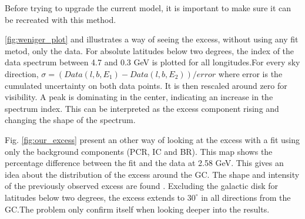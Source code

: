 Before trying to upgrade the current model, it is important to make sure it can be recreated with this method. 

\ref{fig:weniger_plot} and  illustrates a way of seeing the excess, without using any fit metod, only the data. For absolute latitudes below two degrees, the index of the data spectrum between 4.7 and 0.3 GeV is plotted for all longitudes.For every sky direction, $\sigma = \left(Data(l, b, E_1) - Data(l, b, E_2) \right) /  error$ where error is the cumulated uncertainty on both data points. It is then rescaled around zero for visibility. A peak is dominating in the center, indicating an increase in the spectrum index. This can be interpreted as the excess component rising and changing the shape of the spectrum.

Fig. \ref{fig:our_excess} present an other way of looking at the excess with a fit using only the background components (PCR, IC and BR). This map shows the percentage difference between the fit and the data at 2.58 GeV. This gives an idea about the distribution of the excess around the GC. The shape and intensity of the previously observed excess are found . Excluding the galactic disk for latitudes below two degrees, the excess extends to $30^\circ$ in all directions from the GC.The problem only confirm itself when looking deeper into the results.


